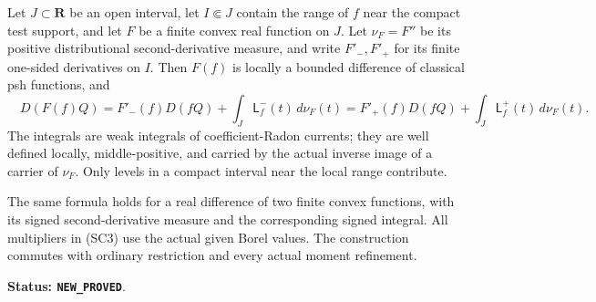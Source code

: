 \begin{theorem}
\label{thm:r11-stieltjes-scalar-curvature}
Let $J\subset\mathbf R$ be an open interval, let $I\Subset J$
contain the range of $f$ near the compact test support, and let
$F$ be a finite convex real function on $J$.  Let $\nu_F=F''$
be its positive distributional second-derivative measure, and
write $F'_-,F'_+$ for its finite one-sided derivatives on $I$.
Then $F(f)$ is locally a bounded difference of classical psh
functions, and
\[
 \boxed{\quad
 D(F(f)Q)
  =F'_-(f)D(fQ)+\int_J\mathsf L_f^{-}(t)\,d\nu_F(t)
  =F'_+(f)D(fQ)+\int_J\mathsf L_f^{+}(t)\,d\nu_F(t).
 \quad}
 \tag{SC3}
\]
The integrals are weak integrals of coefficient-Radon currents;
they are well defined locally, middle-positive, and carried by
the actual inverse image of a carrier of $\nu_F$.
Only levels in a compact interval near the local range contribute.

The same formula holds for a real difference of two finite convex
functions, with its signed second-derivative measure and the
corresponding signed integral.  All multipliers in (SC3) use the
actual given Borel values.  The construction commutes with
ordinary restriction and every actual moment refinement.
\end{theorem}

\noindent\textbf{Status: \texttt{NEW\_PROVED}}.

